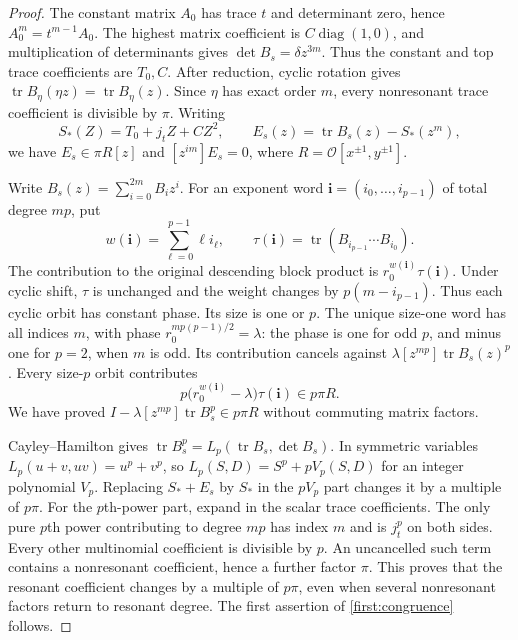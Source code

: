 \begin{proof}
The constant matrix $A_0$ has trace $t$ and determinant zero, hence
$A_0^m=t^{m-1}A_0$. The highest matrix coefficient is
$C\operatorname{diag}(1,0)$, and multiplication of determinants gives
$\det B_s=\delta z^{3m}$. Thus the constant and top trace coefficients
are $T_0,C$. After reduction, cyclic rotation gives
$\operatorname{tr}B_\eta(\eta z)=\operatorname{tr}B_\eta(z)$.
Since $\eta$ has exact order $m$, every nonresonant trace coefficient
is divisible by $\pi$. Writing
\[
 S_*(Z)=T_0+j_tZ+CZ^2,\qquad
 E_s(z)=\operatorname{tr}B_s(z)-S_*(z^m),
\]
we have $E_s\in\pi R[z]$ and $[z^{im}]E_s=0$, where
$R=\mathcal O[x^{\pm1},y^{\pm1}]$.

Write $B_s(z)=\sum_{i=0}^{2m}B_i z^i$. For an exponent word
$\boldsymbol i=(i_0,\ldots,i_{p-1})$ of total degree $mp$, put
\[
 w(\boldsymbol i)=\sum_{\ell=0}^{p-1}\ell i_\ell,\qquad
 \tau(\boldsymbol i)=\operatorname{tr}(B_{i_{p-1}}\cdots B_{i_0}).
\]
The contribution to the original descending block product is
$r_0^{w(\boldsymbol i)}\tau(\boldsymbol i)$. Under cyclic shift,
$\tau$ is unchanged and the weight changes by $p(m-i_{p-1})$.
Thus each cyclic orbit has constant phase. Its size is one or $p$.
The unique size-one word has all indices $m$, with phase
$r_0^{mp(p-1)/2}=\lambda$: the phase is one for odd $p$, and minus
one for $p=2$, when $m$ is odd. Its contribution cancels against
$\lambda[z^{mp}]\operatorname{tr}B_s(z)^p$. Every size-$p$ orbit
contributes
\[
 p\bigl(r_0^{w(\boldsymbol i)}-\lambda\bigr)\tau(\boldsymbol i)
 \in p\pi R.
\]
We have proved
$I-\lambda[z^{mp}]\operatorname{tr}B_s^p\in p\pi R$ without
commuting matrix factors.

Cayley--Hamilton gives $\operatorname{tr}B_s^p=L_p(\operatorname{tr}B_s,\det B_s)$.
In symmetric variables $L_p(u+v,uv)=u^p+v^p$, so
$L_p(S,D)=S^p+pV_p(S,D)$ for an integer polynomial $V_p$.
Replacing $S_*+E_s$ by $S_*$ in the $pV_p$ part changes it by a
multiple of $p\pi$. For the $p$th-power part, expand in the scalar
trace coefficients. The only pure $p$th power contributing to degree
$mp$ has index $m$ and is $j_t^p$ on both sides. Every other
multinomial coefficient is divisible by $p$. An uncancelled such term
contains a nonresonant coefficient, hence a further factor $\pi$.
This proves that the resonant coefficient changes by a multiple of
$p\pi$, even when several nonresonant factors return to resonant
degree. The first assertion of \eqref{first:congruence} follows.


\end{proof}
